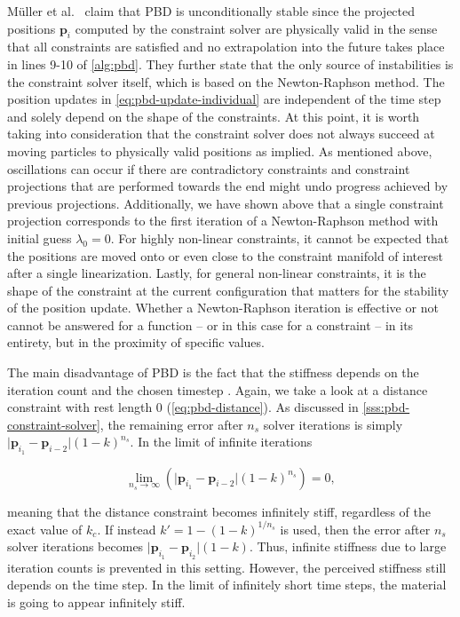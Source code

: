 Müller et al.\ \cite{mueller2006} claim that PBD is unconditionally stable since the projected positions $\bm{p}_i$ computed by the constraint 
solver are physically valid in the sense that all constraints are satisfied and no extrapolation into the future takes place in lines 9-10 of
\cref{alg:pbd}. They further state that the only source of instabilities is the constraint solver itself, which is based on the Newton-Raphson 
method. The position updates in \cref{eq:pbd-update-individual} are independent of the time step and solely depend on the shape of the
constraints. At this point, it is worth taking into consideration that the constraint solver does not always succeed at moving particles to 
physically valid
positions as implied. As mentioned above, oscillations can occur if there are contradictory constraints and constraint projections that are 
performed towards the end might undo progress achieved by previous projections. Additionally, we have shown above that a single constraint 
projection corresponds to the first iteration of a Newton-Raphson method with initial guess $\lambda_0 = 0$. For highly non-linear constraints, 
it cannot be expected that the positions are moved onto or even close to the constraint manifold of interest after a single linearization. 
Lastly, for general non-linear constraints, it is the shape of the constraint at the current configuration that matters for the stability of 
the position update. Whether a Newton-Raphson iteration is effective or not cannot be answered for a function -- or in this case for a 
constraint -- in its entirety, but in the proximity of specific values.

The main disadvantage of PBD is the fact that the stiffness depends on the iteration count and the chosen timestep \cite{mueller2006}. Again, 
we take a look at
a distance constraint with rest length 0 (\cref{eq:pbd-distance}). As discussed in \cref{sss:pbd-constraint-solver}, the remaining error after
$n_s$ solver iterations is simply $\vert \bm{p}_{i_1} - \bm{p}_{i-2} \vert (1-k)^{n_s}$. In the limit of infinite iterations

\[
    \lim_{n_s \to \infty} (\vert \bm{p}_{i_1} - \bm{p}_{i-2} \vert (1-k)^{n_s}) = 0,
\]

\noindent meaning that the distance constraint becomes infinitely stiff, regardless of the exact value of $k_c$. If instead $k\prime 
= 1 - (1-k)^{1/n_s}$ is used, then the error after $n_s$ solver iterations becomes $\vert \bm{p}_{i_1} - \bm{p}_{i_2} \vert (1-k)$. Thus,
infinite stiffness due to large iteration counts is prevented in this setting. However, the perceived stiffness still depends on the time
step. In the limit of infinitely short time steps, the material is going to appear infinitely stiff. 

